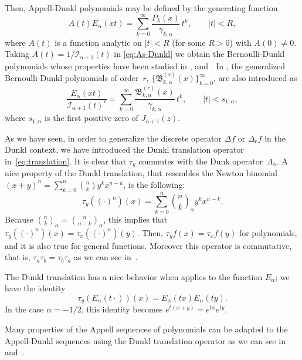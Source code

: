 \documentclass[11pt,a4paper]{article}
\theoremstyle{plain}
\theoremstyle{remark}
\newcommand{\I}{\mathcal{I}}
\newcommand{\Ea}{E_{\alpha}}
\newcommand{\La}{\Lambda_{\alpha}}
\newcommand{\binoma}[2]{\binom{#1}{#2}_{\!\alpha}}
\newcommand{\B}{\mathfrak{B}}
\begin{document}
Then, Appell-Dunkl polynomials may be defined by the generating function
\begin{equation}
\label{eq:As-Dunkl}
  A(t)\Ea(xt) = \sum_{k=0}^{\infty}\frac{P_k(x)}{\gamma_{k,\alpha}} \,t^k,
  \qquad |t|<R,
\end{equation}
where $A(t)$ is a function analytic on $|t|<R$ (for some $R>0$) with $A(0)\ne 0$.
Taking $A(t) = {1}/{\I_{\alpha+1}(t)}$ in \eqref{eq:As-Dunkl} we obtain the Bernoulli-Dunkl polynomials whose properties have been studied in \cite{CDPV}, \cite{CMV} and \cite{MV}. In \cite{CMV}, the generalized Bernoulli-Dunkl polynomials of order~$r$, $\{\B_{k,\alpha}^{(r)}(x)\}_{k=0}^{\infty}$, are also introduced as
\begin{equation}
\label{eq:B-D-gener}
  \frac{\Ea(xt)}{\I_{\alpha+1}(t)^r} 
  = \sum_{k=0}^{\infty} \frac{\B_{k,\alpha}^{(r)}(x)}{\gamma_{k,\alpha}} \,t^k,
  \qquad |t|<s_{1,\alpha},
\end{equation}
where $s_{1,\alpha}$ is the first positive zero of $J_{\alpha+1}(z)$. 

As we have seen, in order to generalize the discrete operator $\Delta f$ or $\Delta_{\mathrm{c}} f$ in the Dunkl context, we have introduced the Dunkl translation operator in~\eqref{eq:translation}.
It is clear that $\tau_y$ commutes with the Dunk operator~$\La$.
A nice property of the Dunkl translation, that resembles the Newton binomial $(x+y)^n = \sum_{k=0}^n \binom{n}{k} y^k x^{n-k}$, is the following:
\begin{equation*}
  \tau_y ((\cdot)^n)(x) = 
  \sum_{k=0}^n \binoma{n}{k} y^k x^{n-k}.
\end{equation*}
Because $\binoma{n}{k} = \binoma{n}{n-k}$, this implies that $\tau_y ((\cdot)^n)(x) = \tau_x ((\cdot)^n)(y)$. Then, $\tau_y f(x) = \tau_x f(y)$ for polynomials, and it is also true for general functions. Moreover this operator is commutative, that is, $\tau_{a} \tau_{b} = \tau_{b} \tau_{a}$ as we can see in~\cite{CMV}.

The Dunkl translation has a nice behavior when applies to the function $\Ea$; we have the identity \cite[formula (4.2.2)]{Ros}
\begin{equation*}
  \tau_y(\Ea(t\cdot))(x) = \Ea(tx) \Ea(ty).
\end{equation*}
In the case $\alpha=-1/2$, this identity becomes $e^{t(x+y)} = e^{tx}e^{ty}$.

Many properties of the Appell sequences of polynomials can be adapted to the Appell-Dunkl sequences
using the Dunkl translation operator as we can see 
in~\cite{CDPV} and~\cite{CMV}. 
\end{document}
